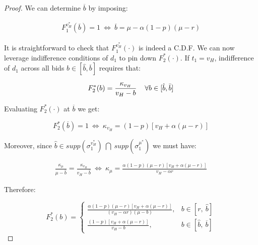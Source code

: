\documentclass[11pt]{article}
\theoremstyle{plain}
\theoremstyle{definition}
\theoremstyle{plain}
\theoremstyle{plain}
\theoremstyle{plain}
\theoremstyle{plain}
\numberwithin{equation}{section}
\begin{document}
\begin{proof}
\vspace{4mm}

\noindent We can determine $ \overline{b} $ by imposing:

\begin{align*}
 F_1^{v_H^*}(\overline{b}) = 1 \ \iff \ \overline{b} = \mu - \alpha(1 - p)(\mu - r)
\end{align*}

\vspace{4mm}

\noindent It is straightforward to check that $ F_1^{v_H^*}(\cdot) $ is indeed a C.D.F. We can now leverage indifference conditions of $ d_1 $ to pin down $ F_2^*(\cdot) $. If $ t_1 = v_H $, indifference of $ d_1 $ across all bids $ b \in [\hat{b}, \overline{b}] $ requires that:

\begin{equation*}
 F_2^*(b) = \frac{\kappa_{v_H}}{v_H - b} \hspace{0.4cm} \forall b \in [\hat{b}, \Bar{b}]    
\end{equation*}

\vspace{0.4cm}

\noindent Evaluating $ F_2^*(\cdot) $ at $ \overline{b} $ we get:

\begin{equation*}
    F_2^*(\overline{b}) = 1 \ \iff \ \kappa_{v_H} = (1 - p)[v_H + \alpha (\mu - r)]
\end{equation*}

\vspace{4mm}

\noindent Moreover, since $ \hat{b} \in supp\left( \sigma_1^{v_H^*} \right) \ \bigcap \ supp\left( \sigma_1^{\mu^*} \right) $ we must have:

\begin{align*}
    \frac{\kappa_{\mu}}{\mu - \hat{b}} = \frac{\kappa_{v_H}}{v_H - \hat{b}} \ \iff \
    \kappa_{\mu} = \frac{\alpha (1 - p) (\mu - r) \left[v_H +\alpha (\mu - r) \right]}{v_H - \alpha r}
\end{align*}

\vspace{0.4cm}

\noindent Therefore:

\begin{equation*}
     F_2^*(b) = \begin{cases}
        \frac{\alpha (1 - p) (\mu - r) \left[v_H +\alpha (\mu - r) \right]}{(v_H - \alpha r)(\mu - b)}, & b \in \left[ r, \ \hat{b} \right] \\[5pt]
        \frac{(1 - p)[v_H + \alpha (\mu - r)]}{v_H - b}, & b \in \left[ \hat{b}, \ \overline{b} \right]
    \end{cases}
\end{equation*}
\vspace{2mm}


\end{proof}
\end{document}
